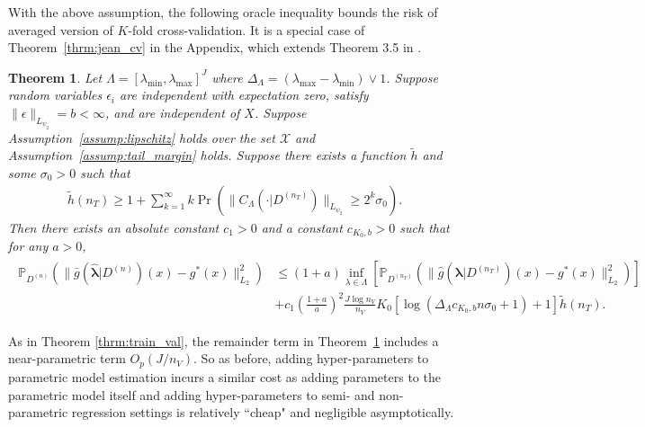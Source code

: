 \documentclass[12pt]{article} %
\newtheorem{theorem}{Theorem}
\theoremstyle{definition}
\begin{document}
With the above assumption, the following oracle inequality bounds the risk of averaged version of $K$-fold cross-validation.
It is a special case of Theorem~\ref{thrm:jean_cv} in the Appendix, which extends Theorem 3.5 in \citet{lecue2012oracle}.
\begin{theorem}
	\label{thrm:kfold}
	Let $\Lambda=[\lambda_{\min},\lambda_{\max}]^{J}$ where $\Delta_{\Lambda} = (\lambda_{\max} - \lambda_{\min}) \vee 1$.
	Suppose random variables $\epsilon_i$ are independent with expectation zero, satisfy $\|\epsilon\|_{L_{\psi_2}}= b <\infty$, and are independent of $X$.
	Suppose Assumption~\ref{assump:lipschitz} holds over the set $\mathcal{X}$ and Assumption~\ref{assump:tail_margin} holds.
	Suppose there exists a function $\tilde{h}$ and some $\sigma_0 > 0$ such that
	\begin{align}
	\tilde{h}(n_{T})
	\ge
	1 + \sum_{k=1}^{\infty}
	k\Pr\left(\|C_\Lambda(\cdot |D^{(n_{T})})\|_{L_{\psi_{2}}}\ge2^{k}\sigma_{0}\right).
	\label{eq:prob_bound_cv}
	\end{align}
	Then there exists an absolute constant $c_{1}>0$ and a constant $c_{K_0, b}>0$ such that for any $a > 0$,
	\begin{align}
	\begin{split}
	\mathbb{P}_{D^{(n)}}\left(
	\|
	\bar{g}(\hat{\boldsymbol{\lambda}}|D^{(n)})(x)
	-g^{*}(x)
	\|_{L_{2}}^{2}\right)
	& \le	(1+a)
	\inf_{\lambda\in\Lambda}
	\left[\mathbb{P}_{D^{(n_{T})}}\left(\|\hat{g}(\boldsymbol{\lambda}|D^{(n_{T})})(x)-g^{*}(x)\|_{L_{2}}^{2}\right)\right] \\
	& +
	c_{1}
	\left (\frac{1+a}{a} \right )^2
	\frac{J\log n_{V}}{n_{V}}
	K_0
	\left[\log\left(\Delta_{\Lambda} c_{K_0, b} n \sigma_0 +1\right)+1\right]
	\tilde{h}(n_{T}).
	\end{split}
	\label{eq:cv_lipschitz_oracle_ineq}
	\end{align}
\end{theorem}

As in Theorem \ref{thrm:train_val}, the remainder term in Theorem~\ref{thrm:kfold} includes a near-parametric term $O_p(J/n_V)$.
So as before, adding hyper-parameters to parametric model estimation incurs a similar cost as adding parameters to the parametric model itself and adding hyper-parameters to semi- and non-parametric regression settings is relatively ``cheap" and negligible asymptotically.
\end{document}
